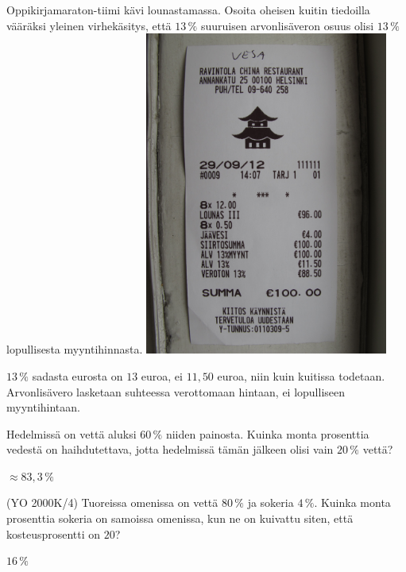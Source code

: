 \begin{tehtavasivu}
\begin{tehtava}
    Oppikirjamaraton-tiimi kävi lounastamassa. Osoita oheisen kuitin tiedoilla vääräksi yleinen virhekäsitys, että $13\,\%$ suuruisen arvonlisäveron osuus olisi $13\,\%$ lopullisesta myyntihinnasta.
    \includegraphics[width=80mm, angle=270]{pictures/alv-kuitti}
    \begin{vastaus}
         $13\,\%$ sadasta eurosta on $13$ euroa, ei $11,50$ euroa, niin kuin kuitissa todetaan. Arvonlisävero lasketaan suhteessa verottomaan hintaan, ei lopulliseen myyntihintaan.
    \end{vastaus}
\end{tehtava}

\begin{tehtava}
    Hedelmissä on vettä aluksi $60\,\%$ niiden painosta. Kuinka monta prosenttia vedestä on haihdutettava, jotta hedelmissä tämän jälkeen olisi vain $20\,\%$ vettä?
    \begin{vastaus}
        $\approx83,3\,\%$
    \end{vastaus}
\end{tehtava}

\begin{tehtava}
    (YO 2000K/4) Tuoreissa omenissa on vettä $80\,\%$ ja sokeria $4\,\%$. Kuinka monta prosenttia sokeria on samoissa omenissa, kun ne on kuivattu siten, että kosteusprosentti on $20$?
    \begin{vastaus}
        $16\,\%$
    \end{vastaus}
\end{tehtava}


\end{tehtavasivu}
